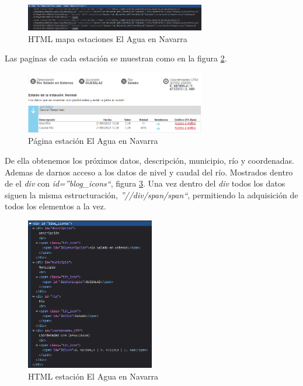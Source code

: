 \begin{figure} [H]
	\centering
	\includegraphics[width=0.7\textwidth]{fig/AguaEnNavarraCodeHTML.png}
	\caption[HTML mapa estaciones de El Agua en Navarra]{HTML mapa estaciones El Agua en Navarra}
	\label{fig:ej22}
\end{figure}

Las paginas de cada estación se muestran como en la figura \ref{fig:ej23}.

\begin{figure} [H]
	\centering
	\includegraphics[width=0.7\textwidth]{fig/AguaEnNavarraEstacion.png}
	\caption[Página estación de El Agua en Navarra]{Página estación El Agua en Navarra}
	\label{fig:ej23}
\end{figure}

De ella obtenemos los próximos datos, descripción, municipio, río y coordenadas. Ademas de darnos acceso a los datos de nivel y caudal del río. Mostrados dentro de el \textit{div} con \textit{id=''blog\_icons``}, figura \ref{fig:ej24}. Una vez dentro del \textit{div} todos los datos siguen la misma estructuración, \textit{''//div/span/span``}, permitiendo la adquisición de todos los elementos a la vez.

\begin{figure} [H]
	\centering
	\includegraphics[width=0.5\textwidth]{fig/AguaEnNavarraEstacionHTML.png}
	\caption[HTML estación de El Agua en Navarra]{HTML estación El Agua en Navarra}
	\label{fig:ej24}
\end{figure}

